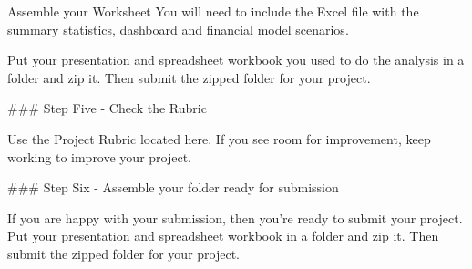 Assemble your Worksheet You will need to include the Excel file with the summary statistics, dashboard and financial model scenarios.

Put your presentation and spreadsheet workbook you used to do the analysis in a folder and zip it. Then submit the zipped folder for your project.

### Step Five - Check the Rubric

Use the Project Rubric located here. If you see room for improvement, keep working to improve your project.

### Step Six - Assemble your folder ready for submission

If you are happy with your submission, then you’re ready to submit your project. Put your presentation and spreadsheet workbook in a folder and zip it. Then submit the zipped folder for your project.